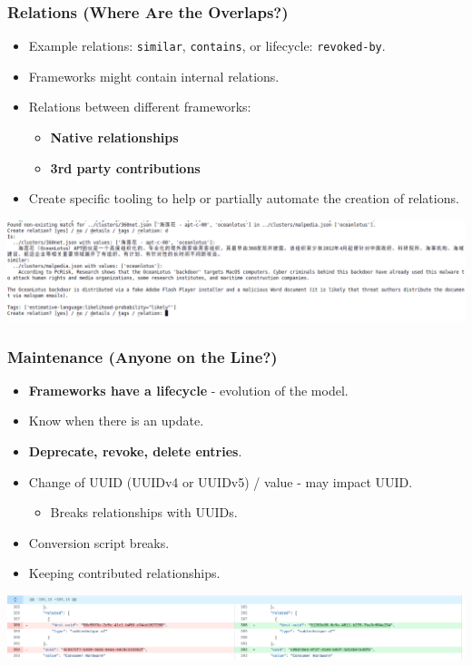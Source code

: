 \begin{frame}
        \frametitle{Relations (Where Are the Overlaps?)}
        \begin{itemize}
            \item Example relations: \texttt{similar}, \texttt{contains}, or lifecycle: \texttt{revoked-by}.
            \item Frameworks might contain internal relations.
            \item Relations between different frameworks:
            \begin{itemize}
                \item \textbf{Native relationships}
                \item \textbf{3rd party contributions}
            \end{itemize}
            \item Create specific tooling to help or partially automate the creation of relations.
        \end{itemize}
        \begin{center}
        \includegraphics[scale=0.35]{./screenshots/rel-gen-example.png}
        \end{center}
\end{frame}

\begin{frame}
        \frametitle{Maintenance (Anyone on the Line?)}
        \begin{itemize}
		\item {\bf Frameworks have a lifecycle} - evolution of the model.
            \item Know when there is an update.
	    \item {\bf Deprecate, revoke, delete entries}.
            \item Change of UUID (UUIDv4 or UUIDv5) / value - may impact UUID.
                \begin{itemize}
                    \item Breaks relationships with UUIDs.
                \end{itemize}
            \item Conversion script breaks.
            \item Keeping contributed relationships.
        \end{itemize}
        \begin{center}
            \includegraphics[scale=0.3]{./screenshots/new-uuids-everywhere.png}
        \end{center}
\end{frame}

